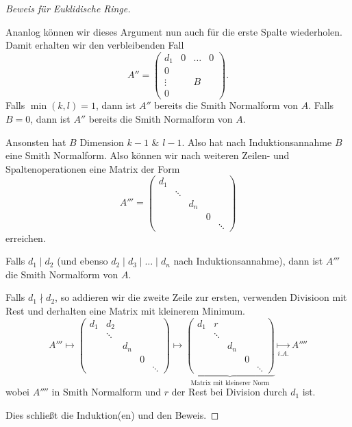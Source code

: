\begin{proof}[Beweis für Euklidische Ringe]
\begin{itemize}
			Ananlog können wir dieses Argument nun auch für die erste Spalte wiederholen.
			Damit erhalten wir den verbleibenden Fall
			\[
			A'' = \begin{pmatrix} 
				d_1 &0 &\ldots &0\\
				0\\
				\vdots & &B\\
				0
			\end{pmatrix} 
			.\]
			Falls $\min(k,l) = 1$, dann ist $A''$ bereits die Smith Normalform von $A$.
			Falls $B = 0$, dann ist $A''$ bereits die Smith Normalform von  $A$.

			Ansonsten hat $B$ Dimension $k-1$ \& $l-1$. Also hat nach Induktionsannahme $B$
			eine Smith Normalform. Also können wir nach weiteren Zeilen- und Spaltenoperationen eine Matrix der Form
			\[
			A''' = \begin{pmatrix} 
				d_1 \\
				& \ddots \\
				& & d_{n} \\
				& & & 0 \\
				& & & & \ddots
			\end{pmatrix} 
			\] 
			erreichen.

			Falls $d_1 \mid d_2$ (und ebenso $d_2 \mid d_3 \mid \ldots \mid d_{n}$ nach Induktionsannahme), dann ist $A'''$ die Smith Normalform von $A$.

			Falls $d_1 \nmid d_2$, so addieren wir die zweite Zeile zur ersten, verwenden Divisioon mit Rest und derhalten eine Matrix mit kleinerem Minimum.
			\[
			A''' \longmapsto \begin{pmatrix} 
				d_1 &d_2\\
				& \ddots \\
				& & d_{n} \\
				& & & 0 \\
				& & & & \ddots
			\end{pmatrix} \mapsto \underbrace{\begin{pmatrix} 
				d_1 &r \\
				& \ddots \\
				& & d_{n} \\
				& & & 0 \\
				& & & & \ddots
		\end{pmatrix}}_{\text{Matrix mit kleinerer Norm}} \underset{i.A.}{\longmapsto} A''''
			\] 
			wobei $A''''$ in Smith Normalform und $r$ der Rest bei Division durch $d_1$ ist.
	\end{itemize}
	Dies schließt die Induktion(en) und den Beweis.
\end{proof}

